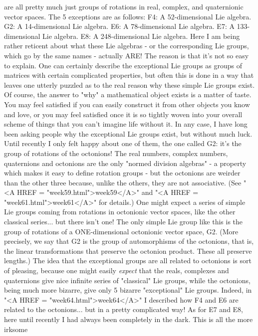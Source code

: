 are all pretty much just groups of rotations in real, complex, and
quaternionic vector spaces.  
The 5 exceptions are as follows:
F4: A 52-dimensional Lie algebra.  
G2: A 14-dimensional Lie algebra. 
E6: A 78-dimensional Lie algebra.  
E7: A 133-dimensional Lie algebra.  
E8: A 248-dimensional Lie algebra.
Here I am being rather reticent about what these Lie algebras - or
the corresponding Lie groups, which go by the same names - actually
ARE!  The reason is that it's not so easy to explain.  One can
certainly describe the exceptional Lie groups as groups of matrices
with certain complicated properties, but often this is done in a way
that leaves one utterly puzzled as to the real reason why these
simple Lie groups exist.
Of course, the answer to "why" a mathematical object exists is a
matter of taste.  You may feel satisfied if you can easily construct
it from other objects you know and love, or you may feel satisfied
once it is so tightly woven into your overall scheme of things that
you can't imagine life without it.  
In any case, I have long been asking people why the exceptional Lie
groups exist, but without much luck.  Until recently I only felt happy
about one of them, the one called G2: it's the group of rotations of
the octonions!  The real numbers, complex numbers, quaternions and
octonions are the only "normed division algebras" - a property which
makes it easy to define rotation groups - but the octonions are
weirder than the other three because, unlike the others, they are not
associative.  (See "<A HREF = "week59.html">week59</A>" and "<A HREF
= "week61.html">week61</A>" for details.)  One might
expect a series of simple Lie groups coming from rotations in
octonionic vector spaces, like the other classical series... but there
isn't one!  The only simple Lie group like this is the group of
rotations of a ONE-dimensional octonionic vector space, G2.
(More precisely, we say that G2 is the group of automorphisms
of the octonions, that is, the linear transformations that preserve
the octonion product.  These all preserve lengths.)
The idea that the exceptional groups are all related to octonions
is sort of pleasing, because one might easily \emph{expect} that the
reals, complexes and quaternions give nice infinite series of
"classical" Lie groups, while the octonions, being much more bizarre,
give only 5 bizarre "exceptional" Lie groups.  Indeed, in "<A HREF = 
"week64.html">week64</A>"
I described how F4 and E6 are related to the octonions... but in a 
pretty complicated way!  As for E7 and E8, here until recently I had 
always been completely in the dark.  This is all the more irksome 
